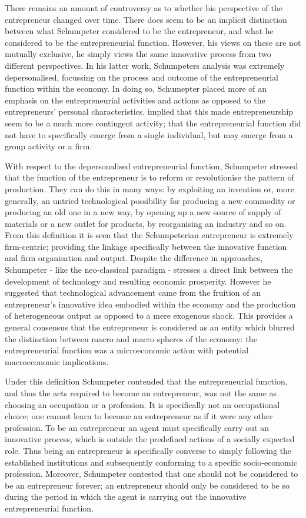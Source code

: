 There remains an amount of controversy as to whether his perspective of the entrepreneur changed over time. There does seem to be an implicit distinction between what Schumpeter considered to be the entrepreneur, and what he considered to be the entrepreneurial function. However, his views on these are not mutually exclusive, he simply views the same innovative process from two different perspectives. In his latter work, Schumpeters analysis was extremely depersonalised, focussing on the process and outcome of the entrepreneurial function within the economy. In doing so, Schumepter placed more of an emphasis on the entrepreneurial activities and actions as opposed to the entrepreneurs' personal characteristics. \citet{BeckerKnudsen2003} implied that this made entrepreneurship seem to be a much more contingent activity; that the entrepreneurial function did not have to specifically emerge from a single individual, but may emerge from a group activity or a firm.

With respect to the depersonalised entrepreneurial function, Schumpeter stressed that the function of the entrepreneur is to reform or revolutionise the pattern of production. They can do this in many ways: by exploiting an invention or, more generally, an untried technological possibility for producing a new commodity or producing an old one in a new way, by opening up a new source of supply of materials or a new outlet for products, by reorganising an industry and so on. From this definition it is seen that the Schumpeterian entrepreneur is extremely firm-centric; providing the linkage specifically between the innovative function and firm organisation and output. Despite the difference in approaches, Schumpeter - like the neo-classical paradigm - stresses a direct link between the development of technology and resulting economic prosperity. However he suggested that technological advancement came from the fruition of an entrepreneur's innovative idea embodied within the economy and the production of heterogeneous output as opposed to a mere exogenous shock. This provides a general consensus that the entrepreneur is considered as an entity which blurred the distinction between macro and macro spheres of the economy: the entrepreneurial function was a microeconomic action with potential macroeconomic implications.

Under this definition Schumpeter contended that the entrepreneurial function, and thus the acts required to become an entrepreneur, was not the same as choosing an occupation or a profession. It is specifically not an occupational choice; one cannot learn to become an entrepreneur as if it were any other profession. To be an entrepreneur an agent must specifically carry out an innovative process, which is outside the predefined actions of a socially expected role. Thus being an entrepreneur is specifically converse to simply following the established institutions and subsequently conforming to a specific socio-economic profession. Moreover, Schumpeter contested that one should not be considered to be an entrepreneur forever; an entrepreneur should only be considered to be so during the period in which the agent is carrying out the innovative entrepreneurial function.

